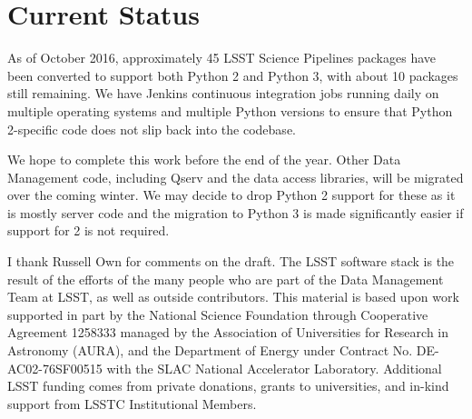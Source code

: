 \documentclass[11pt,twoside]{article}
\begin{document}
\section{Current Status}

As of October 2016, approximately 45 LSST Science Pipelines packages have been converted to support both Python 2 and Python 3, with about 10 packages still remaining.
We have Jenkins continuous integration jobs running daily on multiple operating systems and multiple Python versions to ensure that Python 2-specific code does not slip back into the codebase.

We hope to complete this work before the end of the year.
Other Data Management code, including Qserv and the data access libraries, will be migrated over the coming winter.
We may decide to drop Python 2 support for these as it is mostly server code and the migration to Python 3 is made significantly easier if support for 2 is not required.

\acknowledgements I thank Russell Own for comments on the draft.
The LSST software stack is the result of the efforts of the many people who are part of the Data Management Team at LSST, as well as outside contributors.
This material is based upon work supported in part by the National Science Foundation through Cooperative Agreement 1258333 managed by the Association of Universities for Research in Astronomy (AURA), and the Department of Energy under Contract No. DE-AC02-76SF00515 with the SLAC National Accelerator Laboratory. Additional LSST funding comes from private donations, grants to universities, and in-kind support from LSSTC Institutional Members.

\end{document}
